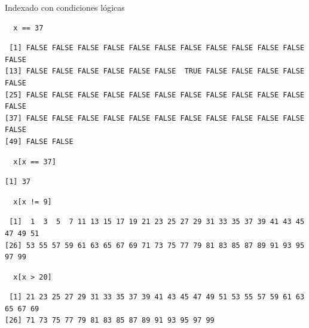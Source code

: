 \documentclass[xcolor={usenames,svgnames,dvipsnames}]{beamer}
\begin{document}
\begin{frame}[fragile,label=sec-3-1-2]{Indexado con condiciones lógicas}
 \lstset{language=R,label= ,caption= ,numbers=none}
\begin{lstlisting}
  x == 37
\end{lstlisting}

\begin{verbatim}
 [1] FALSE FALSE FALSE FALSE FALSE FALSE FALSE FALSE FALSE FALSE FALSE FALSE
[13] FALSE FALSE FALSE FALSE FALSE FALSE  TRUE FALSE FALSE FALSE FALSE FALSE
[25] FALSE FALSE FALSE FALSE FALSE FALSE FALSE FALSE FALSE FALSE FALSE FALSE
[37] FALSE FALSE FALSE FALSE FALSE FALSE FALSE FALSE FALSE FALSE FALSE FALSE
[49] FALSE FALSE
\end{verbatim}

\lstset{language=R,label= ,caption= ,numbers=none}
\begin{lstlisting}
  x[x == 37]
\end{lstlisting}

\begin{verbatim}
[1] 37
\end{verbatim}

\lstset{language=R,label= ,caption= ,numbers=none}
\begin{lstlisting}
  x[x != 9]
\end{lstlisting}

\begin{verbatim}
 [1]  1  3  5  7 11 13 15 17 19 21 23 25 27 29 31 33 35 37 39 41 43 45 47 49 51
[26] 53 55 57 59 61 63 65 67 69 71 73 75 77 79 81 83 85 87 89 91 93 95 97 99
\end{verbatim}

\lstset{language=R,label= ,caption= ,numbers=none}
\begin{lstlisting}
  x[x > 20]
\end{lstlisting}

\begin{verbatim}
 [1] 21 23 25 27 29 31 33 35 37 39 41 43 45 47 49 51 53 55 57 59 61 63 65 67 69
[26] 71 73 75 77 79 81 83 85 87 89 91 93 95 97 99
\end{verbatim}
\end{frame}
\end{document}
